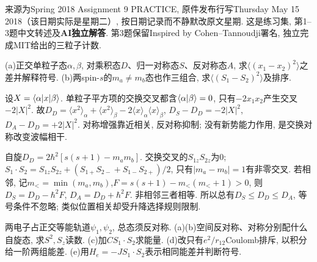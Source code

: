 来源为Spring 2018 Assignment 9 PRACTICE, 原件发布行写Thursday May 15 2018（该日期实际是星期二）, 按日期记录而不静默改原文星期. 这是练习集, 第1--3题中文转述及\textbf{AI独立解答}. 第3题保留Inspired by Cohen--Tannoudji署名, 独立完成MIT给出的三粒子计数.
\begin{exercise}
(a)正交单粒子态$\alpha,\beta$, 对乘积态$D$、归一对称态$S$、反对称态$A$, 求$\langle(x_1-x_2)^2\rangle$之差并解释符号. (b)两spin-$s$的$m_a\ne m_b$态也作三组合, 求$\langle(S_1-S_2)^2\rangle$及排序.
\end{exercise}
\begin{solution}
设$X=\langle \alpha\rvert x\lvert \beta\rangle$. 单粒子平方项的交换交叉都含$\langle \alpha\vert \beta\rangle=0$, 只有$-2x_1x_2$产生交叉$-2|X|^2$. 故$D_D=\langle x^2\rangle_\alpha+\langle x^2\rangle_\beta-2\langle x\rangle_\alpha\langle x\rangle_\beta$, $D_S-D_D=-2|X|^2$, $D_A-D_D=+2|X|^2$. 对称增强靠近相关, 反对称抑制; 没有新势能力作用, 是交换对称改变波幅相干.

自旋$D_D=2\hbar^2[s(s+1)-m_am_b]$. 交换交叉的$S_{1z}S_{2z}$为0; $S_1\cdot S_2=S_{1z}S_{2z}+(S_{1+}S_{2-}+S_{1-}S_{2+})/2$, 只有$|m_a-m_b|=1$有非零交叉. 若相邻, 记$m_< =\min(m_a,m_b)$,$F=s(s+1)-m_<(m_<+1)>0$, 则$D_S=D_D-\hbar^2F$, $D_A=D_D+\hbar^2F$. 非相邻三者相等. 所以总有$D_S\le D_D\le D_A$, 等号条件不忽略; 类似位置相关却受升降选择规则限制.
\end{solution}
\begin{exercise}
两电子占正交等能轨道$\psi_1,\psi_2$, 总态须反对称. (a)(b)空间反对称、对称分别配什么自旋态, 求$S^2,S_z$读数. (c)加$CS_1\cdot S_2$求能量. (d)改只有$e^2/r_{12}$Coulomb排斥, 以积分给一阶两组能差. (e)用$H_e=-JS_1\cdot S_2$表示相同能差并判断符号.
\end{exercise}
